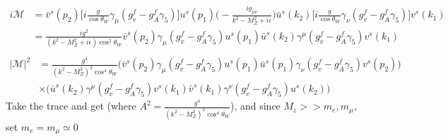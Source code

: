 \documentclass[11pt]{article}
\begin{document}
\begin{align*}
i\mathcal{M} &= \bar{v}^s(p_2) \big[i \frac{g}{\cos \theta_W} \gamma_{\mu} (g_v^f - g_A^f \gamma_5)\big] u^s(p_1) \Big(- \frac{ig_{\mu \nu}}{k^2 - M_Z^2 + i \epsilon} \Big) \bar{u}^s (k_2) \big[i \frac{g}{\cos \theta_W} \gamma_{\nu} (g_v^f - g_A^f \gamma_5)\big] v^s (k_1)\\
&= 
\frac{i g^2}{(k^2 - M_Z^2 + i \epsilon)\cos^2 \theta_W} 
\bar{v}^s(p_2) \gamma_{\mu} (g_v^f - g_A^f \gamma_5) u^s(p_1)  \bar{u}^s (k_2) \gamma^{\mu} (g_v^f - g_A^f \gamma_5) v^s (k_1)\\
\end{align*}
\begin{align*}
|\mathcal{M}|^2 &= \frac{g^4}{(k^2 - M_Z^2)^2\cos^4 \theta_W} 
\Big( \bar{v}^s(p_2) \gamma_{\mu} (g_v^f - g_A^f \gamma_5) u^s(p_1) 
\bar{u}^s(p_1) \gamma_{\nu} (g_v^f - g_A^f \gamma_5) v^s(p_2) 
\Big)\\
& \times
\Big(
 \bar{u}^s (k_2) \gamma^{\mu} (g_v^f - g_A^f \gamma_5) v^s (k_1)
\bar{v}^s (k_1) \gamma^{\nu} (g_v^f - g_A^f \gamma_5) u^s (k_2) 
  \Big)
\end{align*}
Take the trace and get (where $A^2 = \frac{g^4}{(k^2 - M_Z^2)^2\cos^4 \theta_W} $), and since $M_z >> m_e, m_{\mu}$, set $m_e = m_{\mu} \simeq 0$
\end{document}
